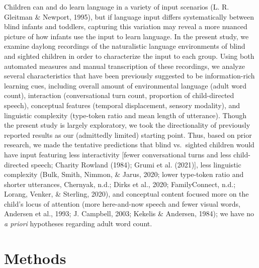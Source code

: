 \documentclass[
  man,floatsintext]{apa6}
\begin{document}
Children can and do learn language in a variety of input scenarios (L. R. Gleitman \& Newport, 1995), but if language input differs systematically between blind infants and toddlers, capturing this variation may reveal a more nuanced picture of how infants use the input to learn language. In the present study, we examine daylong recordings of the naturalistic language environments of blind and sighted children in order to characterize the input to each group. Using both automated measures and manual transcription of these recordings, we analyze several characteristics that have been previously suggested to be information-rich learning cues, including overall amount of environmental language (adult word count), interaction (conversational turn count, proportion of child-directed speech), conceptual features (temporal displacement, sensory modality), and linguistic complexity (type-token ratio and mean length of utterance). Though the present study is largely exploratory, we took the directionality of previously reported results as our (admittedly limited) starting point. Thus, based on prior research, we made the tentative predictions that blind vs.~sighted children would have input featuring less interactivity {[}fewer conversational turns and less child-directed speech; Charity Rowland (1984); Grumi et al. (2021){]}, less linguistic complexity (Bulk, Smith, Nimmon, \& Jarus, 2020; lower type-token ratio and shorter utterances, Chernyak, n.d.; Dirks et al., 2020; FamilyConnect, n.d.; Lorang, Venker, \& Sterling, 2020), and conceptual content focused more on the child's locus of attention (more here-and-now speech and fewer visual words, Andersen et al., 1993; J. Campbell, 2003; Kekelis \& Andersen, 1984); we have no \emph{a priori} hypotheses regarding adult word count.

\hypertarget{methods}{%
\section{Methods}\label{methods}}
\end{document}
